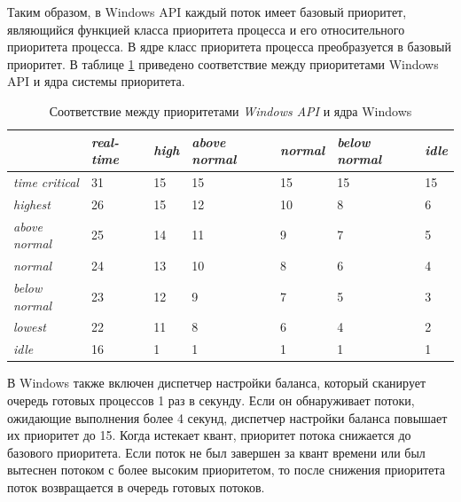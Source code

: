 Таким образом, в Windows API каждый поток имеет базовый приоритет, являющийся функцией класса приоритета процесса и его относительного 
приоритета процесса. В ядре класс приоритета процесса преобразуется в базовый приоритет. В таблице \ref{tbl:priority} приведено соответствие 
между приоритетами Windows API и ядра системы приоритета.

\begin{table}[H]
    \caption{Соответствие между приоритетами \textit{Windows API} и ядра Windows}
    \begin{center}
        \begin{tabularx}{\textwidth}{|l|X|X|X|X|X|X|}
            \hline
            {} & \textit{real-time} & \textit{high} & \textit{above normal} & \textit{normal} & \textit{below normal} & \textit{idle}\\
            \hline
            \textit{time critical} & 31 & 15 & 15 & 15 & 15 & 15 \\
            \hline
            \textit{highest} & 26 & 15 & 12 & 10 & 8 & 6 \\
            \hline
            \textit{above normal} & 25 & 14 & 11 & 9 & 7 & 5 \\
            \hline
            \textit{normal} & 24 & 13 & 10 & 8 & 6 & 4 \\
            \hline
            \textit{below normal} & 23 & 12 & 9 & 7 & 5 & 3 \\
            \hline
            \textit{lowest} & 22 & 11 & 8 & 6 & 4 & 2 \\
            \hline
            \textit{idle} & 16 & 1 & 1 & 1 & 1 & 1 \\
            \hline
        \end{tabularx}
    \end{center}
    \label{tbl:priority}
\end{table}

В Windows также включен диспетчер настройки баланса, который сканирует очередь готовых процессов 1 раз в секунду. 
Если он обнаруживает потоки, ожидающие выполнения более 4
секунд, диспетчер настройки баланса повышает их приоритет до 15. Когда истекает
квант, приоритет потока снижается до базового приоритета. Если поток не был завершен за квант времени или был вытеснен потоком с более высоким приоритетом, то
после снижения приоритета поток возвращается в очередь готовых потоков.

